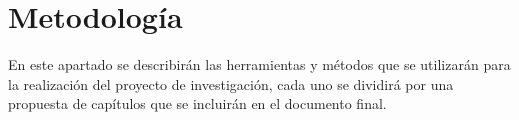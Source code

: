 \section{Metodología}

En este apartado se describirán las herramientas y métodos que se utilizarán para la realización del proyecto de investigación, cada uno se dividirá por una propuesta de capítulos que se incluirán en el documento final.

%

